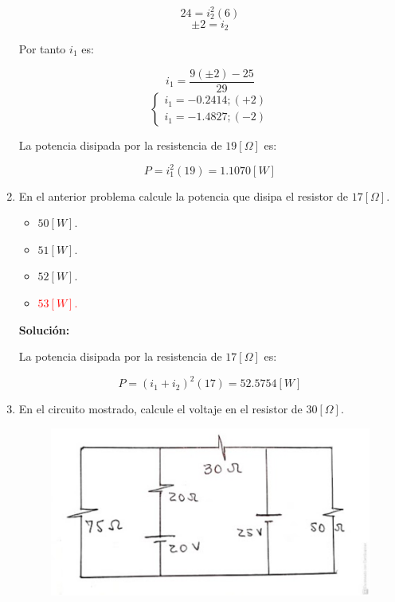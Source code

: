\documentclass[letter,11pt]{article}
\begin{document}
\begin{enumerate}
\begin{equation*}
    24 = i_2^2 (6)
\end{equation*}
\begin{equation*}
    \pm 2 = i_2
\end{equation*}

Por tanto $i_1$ es:

\begin{equation*}
    i_1 = \frac{9(\pm 2)-25}{29}
\end{equation*}
\begin{equation*}
    \begin{cases}
        i_1 = -0.2414; (+2) \\
        i_1 = -1.4827; (-2)
    \end{cases}
\end{equation*}

La potencia disipada por la resistencia de $19 [\Omega]$ es:

\begin{equation*}
    P = i_1^2 (19) = 1.1070 [W]
\end{equation*}

\item En el anterior problema calcule la potencia que disipa el resistor de
$17 [\Omega]$.

\begin{itemize}
    \item $50 [W]$.
    \item $51 [W]$.
    \item $52 [W]$.
    \item \textcolor{red}{$53 [W]$.}
\end{itemize}

\textbf{Solución:}

La potencia disipada por la resistencia de $17 [\Omega]$ es:

\begin{equation*}
    P = (i_1+i_2)^2 (17) = 52.5754 [W]
\end{equation*}

\item En el circuito mostrado, calcule el voltaje en el resistor de
$30 [\Omega]$.

\begin{figure}[!h]
\centering
\includegraphics[scale=0.70]{resources/q5.eps}
\end{figure}


\end{enumerate}
\end{document}
